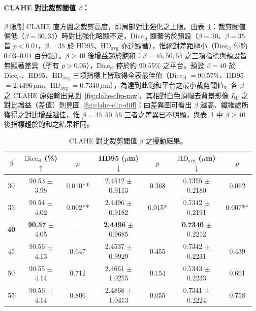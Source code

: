 \paragraph{CLAHE 對比裁剪閾值 $\beta$：} $\beta$ 限制 CLAHE 直方圖之裁剪高度，即局部對比強化之上限。由表~\ref{tab:param-clip}：裁剪閾值偏低（$\beta = 30, 35$）時對比強化略顯不足，$\text{Dice}_{\text{cl}}$ 顯著劣於預設（$\beta = 30$、$\beta = 35$ 皆 $p < 0.01$，$\beta = 35$ 於 HD95、$\text{HD}_{\text{avg}}$ 亦達顯著），惟絕對差距極小（$\text{Dice}_{\text{cl}}$ 僅約 $0.03$--$0.04$ 百分點）。$\beta \ge 40$ 後增益趨於飽和：$\beta = 45, 50, 55$ 之三項指標與預設皆無顯著差異（所有 $p > 0.05$），$\text{Dice}_{\text{cl}}$ 停於約 $90.55\%$ 之平台。預設 $\beta = 40$ 於 $\text{Dice}_{\text{cl}}$、HD95、$\text{HD}_{\text{avg}}$ 三項指標上皆取得全表最佳值（$\text{Dice}_{\text{cl}}$ $= 90.57\%$、HD95 $= 2.4496\,\mu\text{m}$、$\text{HD}_{\text{avg}}$ $= 0.7340\,\mu\text{m}$），為達到此飽和平台之最小裁剪閾值。各 $\beta$ 之 CLAHE 原始輸出見圖~\ref{fig:clahe-clip-raw}，其相對白色頂帽去背景影像 $I_{\text{th}}$ 之對比增益（差值）則見圖~\ref{fig:clahe-clip-diff}：由差異圖可看出 $\beta$ 越高、纖維處所獲得之對比增益越佳，惟 $\beta = 45, 50, 55$ 三者之差異已不明顯，與表~\ref{tab:param-clip} 中 $\beta \ge 40$ 後指標趨於飽和之結果相同。

\begin{table}[htbp]
  \centering
  \caption{CLAHE 對比裁剪閾值 $\beta$ 之擾動結果。}
  \label{tab:param-clip}
  \small
  \setlength{\tabcolsep}{4pt}
  \begin{tabular}{ccccccc}
    \toprule
    $\beta$ & $\text{Dice}_{\text{cl}}$ (\%) $\uparrow$ & $p$ & HD95 ($\mu$m) $\downarrow$ & $p$ & $\text{HD}_{\text{avg}}$ ($\mu$m) $\downarrow$ & $p$ \\
    \midrule
    $30$ & 90.53 $\pm$ 3.98 & 0.010** & 2.4512 $\pm$ 0.9113 & 0.368  & 0.7355 $\pm$ 0.2180 & 0.062 \\
    $35$ & 90.54 $\pm$ 4.02 & 0.002** & 2.4496 $\pm$ 0.9182 & 0.015* & 0.7342 $\pm$ 0.2191 & 0.007** \\
    \textbf{40} & \textbf{90.57} $\pm$ 4.05 & --- & \textbf{2.4496} $\pm$ 0.9685 & --- & \textbf{0.7340} $\pm$ 0.2212 & --- \\
    $45$ & 90.56 $\pm$ 4.13 & 0.647 & 2.4537 $\pm$ 0.9929 & 0.455 & 0.7342 $\pm$ 0.2231 & 0.439 \\
    $50$ & 90.55 $\pm$ 4.14 & 0.712 & 2.4661 $\pm$ 1.0255 & 0.154 & 0.7343 $\pm$ 0.2233 & 0.661 \\
    $55$ & 90.56 $\pm$ 4.14 & 0.806 & 2.4868 $\pm$ 1.0413 & 0.055 & 0.7341 $\pm$ 0.2224 & 0.758 \\
    \bottomrule
  \end{tabular}
\end{table}

